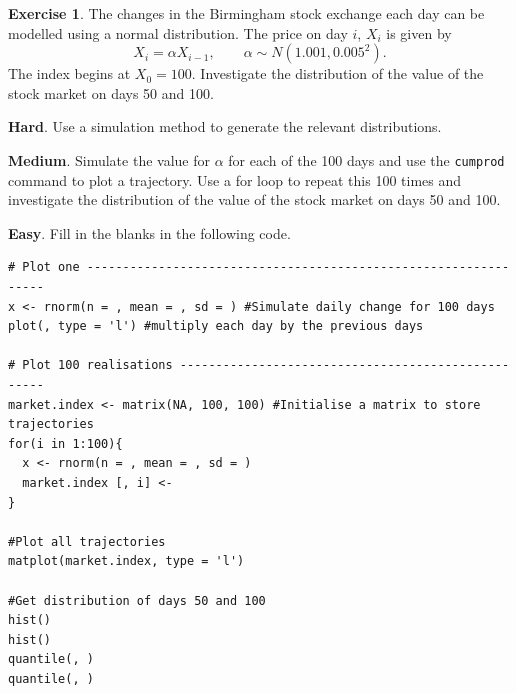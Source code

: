 \documentclass[
]{book}
\theoremstyle{definition}
\theoremstyle{definition}
\theoremstyle{definition}
\newtheorem{exercise}{Exercise}[chapter]
\theoremstyle{definition}
\theoremstyle{remark}
\begin{document}
\begin{exercise}

The changes in the Birmingham stock exchange each day can be modelled using a normal distribution. The price on day \(i\), \(X_i\) is given by
\[
X_i = \alpha X_{i-1}, \qquad \alpha \sim N(1.001, 0.005^2).
\]
The index begins at \(X_0 = 100\). Investigate the distribution of the value of the stock market on days 50 and 100.

\textbf{Hard}. Use a simulation method to generate the relevant distributions.

\textbf{Medium}. Simulate the value for \(\alpha\) for each of the 100 days and use the \texttt{cumprod} command to plot a trajectory. Use a for loop to repeat this 100 times and investigate the distribution of the value of the stock market on days 50 and 100.

\textbf{Easy}. Fill in the blanks in the following code.

\begin{verbatim}
# Plot one ----------------------------------------------------------------
x <- rnorm(n = , mean = , sd = ) #Simulate daily change for 100 days
plot(, type = 'l') #multiply each day by the previous days

# Plot 100 realisations ---------------------------------------------------
market.index <- matrix(NA, 100, 100) #Initialise a matrix to store trajectories
for(i in 1:100){
  x <- rnorm(n = , mean = , sd = )
  market.index [, i] <- 
}

#Plot all trajectories
matplot(market.index, type = 'l')

#Get distribution of days 50 and 100
hist()
hist()
quantile(, )
quantile(, )
\end{verbatim}

\end{exercise}
\end{document}
